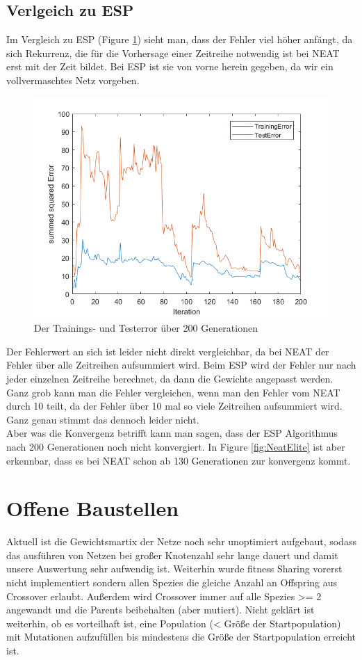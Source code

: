 \documentclass{hbrs-ecta-report}
\begin{document}
\subsection{Verlgeich zu ESP}
Im Vergleich zu ESP (Figure \ref{fig:ESP}) sieht man, dass der Fehler viel höher anfängt, da sich Rekurrenz, die für die Vorhersage einer Zeitreihe notwendig ist bei NEAT erst mit der Zeit bildet. Bei ESP ist sie von vorne herein gegeben, da wir ein vollvermaschtes Netz vorgeben.\\
\begin{figure}[h!]
	\includegraphics[width=\linewidth]{img/ESP2}
	\caption{Der Trainings- und Testerror über 200 Generationen}
	\label{fig:ESP}
\end{figure}

Der Fehlerwert an sich ist leider nicht direkt vergleichbar, da bei NEAT der Fehler über alle Zeitreihen aufsummiert wird. Beim ESP wird der Fehler nur nach jeder einzelnen Zeitreihe berechnet, da dann die Gewichte angepasst werden. Ganz grob kann man die Fehler vergleichen, wenn man den Fehler vom NEAT durch 10 teilt, da der Fehler über 10 mal so viele Zeitreihen aufsummiert wird. Ganz genau stimmt das dennoch leider nicht.\\
Aber was die Konvergenz betrifft kann man sagen, dass der ESP Algorithmus nach 200 Generationen noch nicht konvergiert. In Figure \ref{fig:NeatElite} ist aber erkennbar, dass es bei NEAT schon ab 130 Generationen zur konvergenz kommt.

\section{Offene Baustellen}
Aktuell ist die Gewichtsmartix der Netze noch sehr unoptimiert aufgebaut, sodass das ausführen von Netzen bei großer Knotenzahl sehr lange dauert und damit unsere Auswertung sehr aufwendig ist.
Weiterhin wurde fitness Sharing vorerst nicht implementiert sondern allen Spezies die gleiche Anzahl an Offspring aus Crossover erlaubt. Außerdem wird Crossover immer auf alle Spezies >= 2 angewandt und die Parents beibehalten (aber mutiert).
Nicht geklärt ist weiterhin, ob es vorteilhaft ist, eine Population (< Größe der Startpopulation) mit Mutationen aufzufüllen bis mindestens die Größe der Startpopulation erreicht ist.
\end{document}
